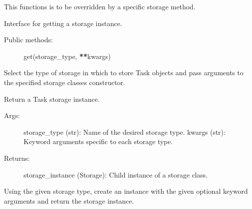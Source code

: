 \documentclass[letterpaper,10pt,english]{sphinxmanual}
\begin{document}
\begin{fulllineitems}
\begin{fulllineitems}
\end{fulllineitems}



\begin{fulllineitems}
\label{index:storage.Storage.update}
This functions is to be overridden by a specific storage method.

\end{fulllineitems}


\end{fulllineitems}



\begin{fulllineitems}
\label{index:storage.StorageFactory}
Interface for getting a storage instance.
\begin{description}
\item[{Public methods:}] \leavevmode
get(storage\_type, {\color{red}\bfseries{}**}kwargs)

\end{description}

Select the type of storage in which to store Task objects and pass
arguments to the specified storage classes constructor.


\begin{fulllineitems}
\label{index:storage.StorageFactory.get}
Return a Task storage instance.
\begin{description}
\item[{Args:}] \leavevmode
storage\_type (str): Name of the desired storage type.
kwargs (str): Keyword arguments specific to each storage type.

\item[{Returns:}] \leavevmode
storage\_instance (Storage): Child instance of a storage class.

\end{description}

Using the given storage type, create an instance with the given
optional keyword arguments and return the storage instance.

\end{fulllineitems}


\end{fulllineitems}
\end{document}
